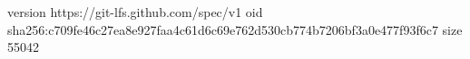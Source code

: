 version https://git-lfs.github.com/spec/v1
oid sha256:c709fe46c27ea8e927faa4c61d6c69e762d530cb774b7206bf3a0e477f93f6c7
size 55042
